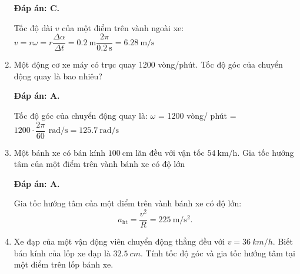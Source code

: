 \begin{enumerate}[label=\bfseries Câu \arabic*:, leftmargin=1.5cm]
	\hideall
	{	
		\textbf{Đáp án: C.}
		
		Tốc độ dài $v$ của một điểm trên vành ngoài xe:
		$v=r\omega=r\dfrac{\Delta \alpha}{\Delta t}=\SI{0,2}{\meter}\dfrac{2\pi}{\SI{0.2}{\second}}=\SI{6,28}{\meter/\second}$
	}
	\item {}
	
	
	{
		Một động cơ xe máy có trục quay 1200 vòng/phút. Tốc độ góc của chuyển động quay là bao nhiêu?
	}
	
	\hideall
	{	
		\textbf{Đáp án: A.}
		
		Tốc độ góc của chuyển động quay là:
		$\omega$ = 1200 vòng/ phút = $1200\cdot\dfrac{2\pi}{60}\,\SI{}{\radian/\second}=\SI{125,7}{\radian/\second}$
	}
	\item {}
	
	
	{
		Một bánh xe có bán kính $\SI{100}{\centi\meter}$ lăn đều với vận tốc $\SI{54}{\kilo\meter/\hour}$. Gia tốc hướng tâm của một điểm trên vành bánh xe có độ lớn
	}
	
	\hideall
	{	
		\textbf{Đáp án: A.}
		
		Gia tốc hướng tâm của một điểm trên vành bánh xe có độ lớn:
		$$a_\text{ht}=\dfrac{v^2}{R}=\SI{225}{\meter/\second^2}.$$
	}
	
	\item {}
	
	
	{
		Xe đạp của một vận động viên chuyển động thẳng đều với $v=\SI{36}{km/h}$. Biết bán kính của lốp xe đạp là $\SI{32.5}{cm}$. Tính tốc độ góc và gia tốc hướng tâm tại một điểm trên lốp bánh xe.
	}
	

\end{enumerate}
